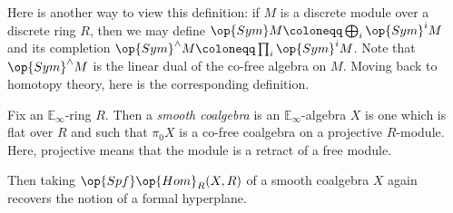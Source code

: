 \documentclass[../notes.tex]{subfiles}
\begin{document}
Here is another way to view this definition: if $M$ is a discrete module over a discrete ring $R$, then we may define $\op{Sym}M\coloneqq\bigoplus_i\op{Sym}^iM$ and its completion $\op{Sym}^\land M\coloneqq\prod_i\op{Sym}^iM$. Note that $\op{Sym}^\land M$ is the linear dual of the co-free algebra on $M$. Moving back to homotopy theory, here is the corresponding definition.
\begin{definition}[smooth]
	Fix an $\mathbb E_\infty$-ring $R$. Then a \textit{smooth coalgebra} is an $\mathbb E_\infty$-algebra $X$ is one which is flat over $R$ and such that $\pi_0X$ is a co-free coalgebra on a projective $R$-module. Here, projective means that the module is a retract of a free module.
\end{definition}
Then taking $\op{Spf}\op{Hom}_R(X,R)$ of a smooth coalgebra $X$ again recovers the notion of a formal hyperplane.
\end{document}
